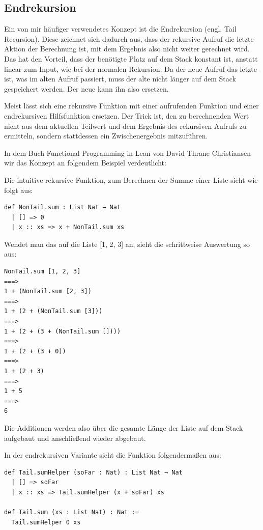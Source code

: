\subsection{Endrekursion}
Ein von mir häufiger verwendetes Konzept ist die Endrekursion (engl. Tail Recursion).
Diese zeichnet sich dadurch aus, dass der rekursive Aufruf die letzte Aktion der Berechnung ist, mit dem Ergebnis also nicht weiter gerechnet wird.
Das hat den Vorteil, dass der benötigte Platz auf dem Stack konstant ist, anstatt linear zum Input, wie bei der normalen Rekursion.
Da der neue Aufruf das letzte ist, was im alten Aufruf passiert, muss der alte nicht länger auf dem Stack gespeichert werden.
Der neue kann ihn also ersetzen.

Meist lässt sich eine rekursive Funktion mit einer aufrufenden Funktion und einer endrekursiven Hilfsfunktion ersetzen.
Der Trick ist, den zu berechnenden Wert nicht aus dem aktuellen Teilwert und dem Ergebnis des rekursiven Aufrufs zu ermitteln, sondern stattdessen ein Zwischenergebnis mitzuführen.

In dem Buch Functional Programming in Lean\cite{functional_programming_in_lean} von David Thrane Christiansen wir das Konzept an folgendem Beispiel verdeutlicht:

Die intuitive rekursive Funktion, zum Berechnen der Summe einer Liste sieht wie folgt aus:

\begin{lstlisting}
def NonTail.sum : List Nat → Nat
  | [] => 0
  | x :: xs => x + NonTail.sum xs
\end{lstlisting}

Wendet man das auf die Liste [1, 2, 3] an, sieht die schrittweise Auswertung so aus:

\begin{lstlisting}
NonTail.sum [1, 2, 3]
===>
1 + (NonTail.sum [2, 3])
===>
1 + (2 + (NonTail.sum [3]))
===>
1 + (2 + (3 + (NonTail.sum [])))
===>
1 + (2 + (3 + 0))
===>
1 + (2 + 3)
===>
1 + 5
===>
6
\end{lstlisting}

Die Additionen werden also über die gesamte Länge der Liste auf dem Stack aufgebaut und anschließend wieder abgebaut.

In der endrekursiven Variante sieht die Funktion folgendermaßen aus:

\begin{lstlisting}
def Tail.sumHelper (soFar : Nat) : List Nat → Nat
  | [] => soFar
  | x :: xs => Tail.sumHelper (x + soFar) xs

def Tail.sum (xs : List Nat) : Nat :=
  Tail.sumHelper 0 xs
\end{lstlisting}


